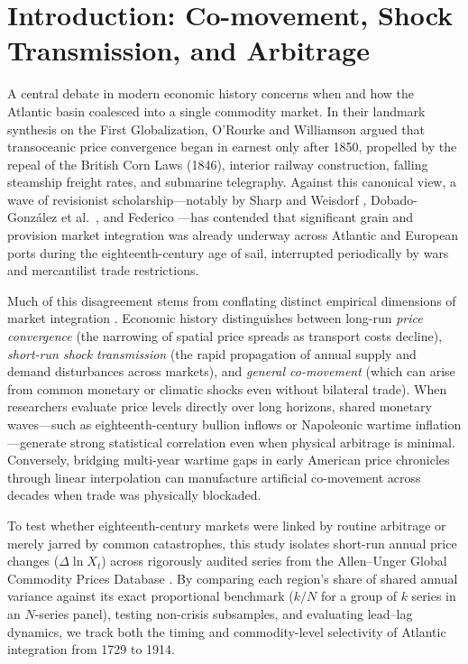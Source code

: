 \documentclass{article}
\begin{document}
\section{Introduction: Co-movement, Shock Transmission, and Arbitrage}
A central debate in modern economic history concerns when and how the Atlantic basin coalesced into a single commodity market. In their landmark synthesis on the First Globalization, O'Rourke and Williamson \cite{orourke1999,orourke2002} argued that transoceanic price convergence began in earnest only after 1850, propelled by the repeal of the British Corn Laws (1846), interior railway construction, falling steamship freight rates, and submarine telegraphy. Against this canonical view, a wave of revisionist scholarship---notably by Sharp and Weisdorf \cite{sharp2013}, Dobado-Gonz\'alez et al.\ \cite{dobado2012}, and Federico \cite{federico2011}---has contended that significant grain and provision market integration was already underway across Atlantic and European ports during the eighteenth-century age of sail, interrupted periodically by wars and mercantilist trade restrictions.

Much of this disagreement stems from conflating distinct empirical dimensions of market integration \cite{federico2012}. Economic history distinguishes between long-run \textit{price convergence} (the narrowing of spatial price spreads as transport costs decline), \textit{short-run shock transmission} (the rapid propagation of annual supply and demand disturbances across markets), and \textit{general co-movement} (which can arise from common monetary or climatic shocks even without bilateral trade). When researchers evaluate price levels directly over long horizons, shared monetary waves---such as eighteenth-century bullion inflows or Napoleonic wartime inflation---generate strong statistical correlation even when physical arbitrage is minimal. Conversely, bridging multi-year wartime gaps in early American price chronicles through linear interpolation can manufacture artificial co-movement across decades when trade was physically blockaded.

To test whether eighteenth-century markets were linked by routine arbitrage or merely jarred by common catastrophes, this study isolates short-run annual price changes ($\Delta \ln X_t$) across rigorously audited series from the Allen--Unger Global Commodity Prices Database \cite{allenunger2026}. By comparing each region's share of shared annual variance against its exact proportional benchmark ($k/N$ for a group of $k$ series in an $N$-series panel), testing non-crisis subsamples, and evaluating lead--lag dynamics, we track both the timing and commodity-level selectivity of Atlantic integration from 1729 to 1914.
\end{document}
